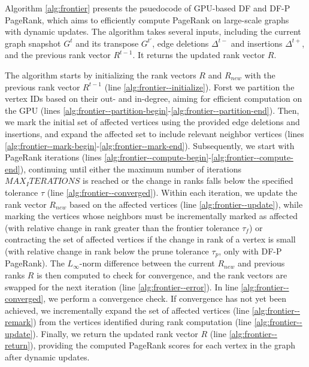 Algorithm \ref{alg:frontier} presents the psuedocode of GPU-based DF and DF-P PageRank, which aims to efficiently compute PageRank on large-scale graphs with dynamic updates. The algorithm takes several inputs, including the current graph snapshot $G^t$ and its transpose $G^{t'}$, edge deletions $\Delta^{t-}$ and insertions $\Delta^{t+}$, and the previous rank vector $R^{t-1}$. It returns the updated rank vector $R$.

The algorithm starts by initializing the rank vectors $R$ and $R_{new}$ with the previous rank vector $R^{t-1}$ (line \ref{alg:frontier--initialize}). Forst we partition the vertex IDs based on their out- and in-degree, aiming for efficient computation on the GPU (lines \ref{alg:frontier--partition-begin}-\ref{alg:frontier--partition-end}). Then, we mark the initial set of affected vertices using the provided edge deletions and insertions, and expand the affected set to include relevant neighbor vertices (lines \ref{alg:frontier--mark-begin}-\ref{alg:frontier--mark-end}). Subsequently, we start with PageRank iterations (lines \ref{alg:frontier--compute-begin}-\ref{alg:frontier--compute-end}), continuing until either the maximum number of iterations $MAX_ITERATIONS$ is reached or the change in ranks falls below the specified tolerance $\tau$ (line \ref{alg:frontier--converged}). Within each iteration, we update the rank vector $R_{new}$ based on the affected vertices (line \ref{alg:frontier--update}), while marking the vertices whose neighbors must be incrementally marked as affected (with relative change in rank greater than the frontier tolerance $\tau_f$) or contracting the set of affected vertices if the change in rank of a vertex is small (with relative change in rank below the prune tolerance $\tau_p$, only with DF-P PageRank). The $L_\infty$-norm difference between the current $R_{new}$ and previous ranks $R$ is then computed to check for convergence, and the rank vectors are swapped for the next iteration (line \ref{alg:frontier--error}). In line \ref{alg:frontier--converged}, we perform a convergence check. If convergence has not yet been achieved, we incrementally expand the set of affected vertices (line \ref{alg:frontier--remark}) from the vertices identified during rank computation (line \ref{alg:frontier--update}). Finally, we return the updated rank vector $R$ (line \ref{alg:frontier--return}), providing the computed PageRank scores for each vertex in the graph after dynamic updates.

